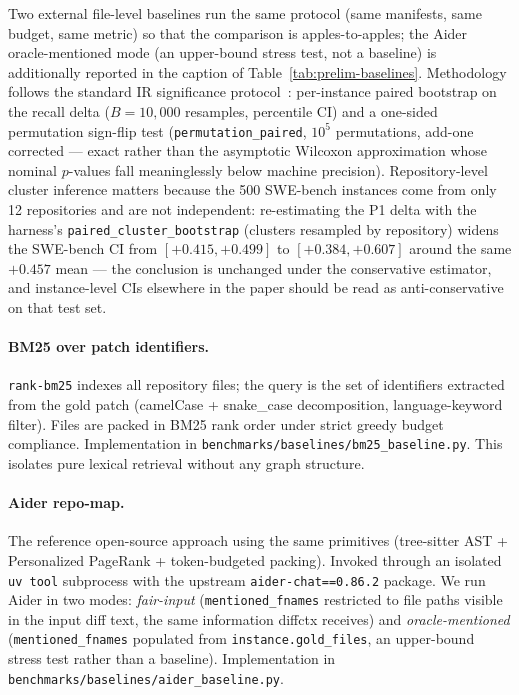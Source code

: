 \documentclass[11pt, a4paper]{article}
\begin{document}
Two external file-level baselines run the same protocol (same manifests, same budget, same metric) so that the comparison is apples-to-apples; the Aider oracle-mentioned mode (an upper-bound stress test, not a baseline) is additionally reported in the caption of Table~\ref{tab:prelim-baselines}. Methodology follows the standard IR significance protocol~\cite{smucker2007comparison}: per-instance paired bootstrap on the recall delta ($B{=}10{,}000$ resamples, percentile CI) and a one-sided permutation sign-flip test (\texttt{permutation\_paired}, $10^5$ permutations, add-one corrected --- exact rather than the asymptotic Wilcoxon approximation whose nominal $p$-values fall meaninglessly below machine precision). Repository-level cluster inference matters because the 500 SWE-bench instances come from only 12 repositories and are not independent: re-estimating the P1 delta with the harness's \texttt{paired\_cluster\_bootstrap} (clusters resampled by repository) widens the SWE-bench CI from $[+0.415, +0.499]$ to $[+0.384, +0.607]$ around the same $+0.457$ mean --- the conclusion is unchanged under the conservative estimator, and instance-level CIs elsewhere in the paper should be read as anti-conservative on that test set.

\paragraph{BM25 over patch identifiers.} \texttt{rank-bm25} indexes all repository files; the query is the set of identifiers extracted from the gold patch (camelCase + snake\_case decomposition, language-keyword filter). Files are packed in BM25 rank order under strict greedy budget compliance. Implementation in \texttt{benchmarks/baselines/bm25\_baseline.py}. This isolates pure lexical retrieval without any graph structure.

\paragraph{Aider repo-map.} The reference open-source approach using the same primitives (tree-sitter AST + Personalized PageRank + token-budgeted packing). Invoked through an isolated \texttt{uv tool} subprocess with the upstream \texttt{aider-chat==0.86.2} package. We run Aider in two modes: \emph{fair-input} (\texttt{mentioned\_fnames} restricted to file paths visible in the input diff text, the same information diffctx receives) and \emph{oracle-mentioned} (\texttt{mentioned\_fnames} populated from \texttt{instance.gold\_files}, an upper-bound stress test rather than a baseline). Implementation in \texttt{benchmarks/baselines/aider\_baseline.py}.
\end{document}

